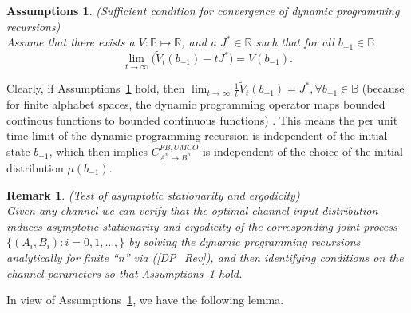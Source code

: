 \documentclass[11pt, a4paper, journal,onecolumn]{IEEEtran}
\newcommand{\mb}{\mathbb}
\newcommand{\rar}{\rightarrow}
\newtheorem{remark}{Remark}[section]
\newtheorem{assumptions}{Assumptions}[section]
\begin{document}
\begin{assumptions}(Sufficient condition for convergence of dynamic programming recursions) 
\label{Ass_ST}\\
Assume that there exists a $V:{\mb B} \longmapsto {\mathbb R}$, and a $J^*\in \mathbb{R}$ such that for all $ b_{-1}\in \mathbb{B}$
\begin{equation}\label{inf.DP.assum.1a}
\lim_{t\longrightarrow \infty}\Big(\widetilde{V}_t(b_{-1})-tJ^*\Big)=V(b_{-1}).
\end{equation}
\end{assumptions}

Clearly, if Assumptions~\ref{Ass_ST} hold, then  $\lim_{t\longrightarrow \infty} \frac{1}{t} \widetilde{V}_t(b_{-1})= J^*, \forall b_{-1}\in \mathbb{B}$ (because for finite alphabet spaces, the dynamic programming operator maps bounded continous functions to bounded continuous functions) \cite{varayia86}. This means the per unit time limit of the dynamic programming recursion is independent of the initial state $b_{-1}$, which then implies $C_{A^n \rar B^n}^{FB,UMCO}$ is independent of  the choice of the initial distribution $\mu(b_{-1})$. \\


\begin{remark}(Test of asymptotic stationarity and ergodicity)\\
\label{rem_test_1}
Given any channel we can verify that the optimal channel input distribution induces asymptotic stationarity and ergodicity of the corresponding joint process $\big\{(A_i, B_i): i=0, 1, \ldots, \big\}$ by  solving  the dynamic programming recursions analytically for finite ``n'' via (\ref{DP_Rev}), and then identifying conditions on the channel parameters so that Assumptions~\ref{Ass_ST} hold. 
\end{remark}

In view of Assumptions~\ref{Ass_ST}, we have the following lemma.\\
\end{document}
